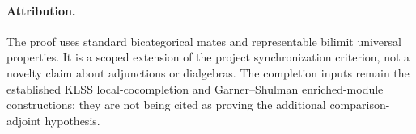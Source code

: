 \documentclass{article}
\begin{document}
\paragraph{Attribution.} The proof uses standard bicategorical mates and representable bilimit universal properties. It is a scoped extension of the project synchronization criterion, not a novelty claim about adjunctions or dialgebras. The completion inputs remain the established KLSS local-cocompletion and Garner--Shulman enriched-module constructions; they are not being cited as proving the additional comparison-adjoint hypothesis.
\end{document}
